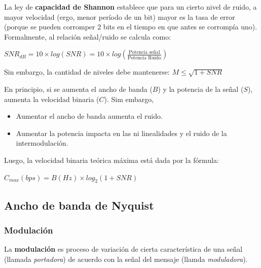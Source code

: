 \documentclass[]{article}
\begin{document}
La ley de \textbf{capacidad de Shannon} establece que para un cierto nivel de ruido, a mayor velocidad (ergo, menor período de un bit) mayor es la tasa de error (porque se pueden corromper 2 bits en el tiempo en que antes se corrompía uno). Formalmente, al relación señal/ruido se calcula como:

\begin{center}
    $SNR_{dB} = 10\times log(SNR) = 10\times log\left(\displaystyle\frac{\text{Potencia señal}}{\text{Potencia Ruido}}\right)$
\end{center}

Sin embargo, la cantidad de niveles debe mantenerse: $M \leq \displaystyle \sqrt{1+SNR}$

En principio, si se aumenta el ancho de banda ($B$) y la potencia de la señal ($S$), aumenta la velocidad binaria ($C$). Sim embargo,
\begin{itemize}
    \item Aumentar el ancho de banda aumenta el ruido.
    \item Aumentar la potencia impacta en las ni linealidades y el ruido de la intermodulación.
\end{itemize}

Luego, la velocidad binaria teórica máxima está dada por la fórmula:
\begin{center}
    $C_{max}(bps) = B(Hz)\times log_2(1+SNR)$
\end{center}

\subsection{Ancho de banda de Nyquist}



\subsubsection {Modulación}
La \textbf{modulación} es proceso de variación de cierta característica de una señal (llamada \emph{portadora}) de acuerdo con la señal del mensaje (llamda \emph{moduladora}).
\end{document}

